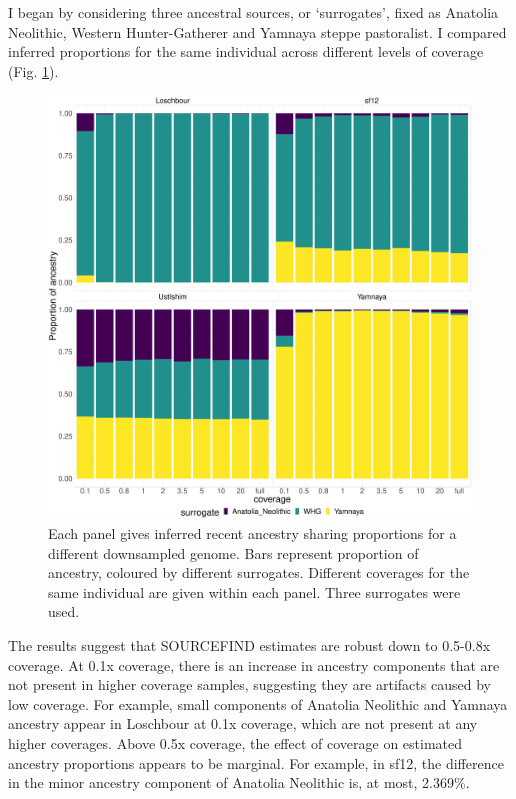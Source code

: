 I began by considering three ancestral sources, or `surrogates', fixed as Anatolia Neolithic, Western Hunter-Gatherer and Yamnaya steppe pastoralist. I compared inferred proportions for the same individual across different levels of coverage (Fig. \ref{fig:3pop_SF_downsampled}). 

\begin{figure}[htp]
    \centering
    \includegraphics[width=1.0\textwidth]{../images/chapter1/3pop_SF_downsampled.pdf}
    \caption{Each panel gives inferred recent ancestry sharing proportions for a different downsampled genome. Bars represent proportion of ancestry, coloured by different surrogates. Different coverages for the same individual are given within each panel. Three surrogates were used.}
    \label{fig:3pop_SF_downsampled}
\end{figure}

The results suggest that SOURCEFIND estimates are robust down to 0.5-0.8x coverage. At 0.1x coverage, there is an increase in ancestry components that are not present in higher coverage samples, suggesting they are artifacts caused by low coverage. For example, small components of Anatolia Neolithic and Yamnaya ancestry appear in Loschbour at 0.1x coverage, which are not present at any higher coverages. Above 0.5x coverage, the effect of coverage on estimated ancestry proportions appears to be marginal. For example, in sf12, the difference in the minor ancestry component of Anatolia Neolithic is, at most, 2.369\%.

